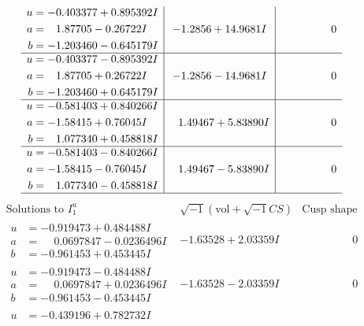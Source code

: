 \documentclass[1p]{elsarticle_modified}
\theoremstyle{definition}
\newcommand{\I}{\sqrt{-1}}
\begin{document}
$$\begin{array}{c|c|c}
\begin{aligned}
u &= -0.403377 + 0.895392 I \\
a &= \phantom{-}1.87705 - 0.26722 I \\
b &= -1.203460 - 0.645179 I\end{aligned}
 & -1.2856 + 14.9681 I & \phantom{-0.000000 } 0 \\ \hline\begin{aligned}
u &= -0.403377 - 0.895392 I \\
a &= \phantom{-}1.87705 + 0.26722 I \\
b &= -1.203460 + 0.645179 I\end{aligned}
 & -1.2856 - 14.9681 I & \phantom{-0.000000 } 0 \\ \hline\begin{aligned}
u &= -0.581403 + 0.840266 I \\
a &= -1.58415 + 0.76045 I \\
b &= \phantom{-}1.077340 + 0.458818 I\end{aligned}
 & \phantom{-}1.49467 + 5.83890 I & \phantom{-0.000000 } 0 \\ \hline\begin{aligned}
u &= -0.581403 - 0.840266 I \\
a &= -1.58415 - 0.76045 I \\
b &= \phantom{-}1.077340 - 0.458818 I\end{aligned}
 & \phantom{-}1.49467 - 5.83890 I & \phantom{-0.000000 } 0\\
 \hline 
 \end{array}$$\newpage$$\begin{array}{c|c|c}  
\text{Solutions to }I^u_{1}& \I (\text{vol} + \sqrt{-1}CS) & \text{Cusp shape}\\
 \hline 
\begin{aligned}
u &= -0.919473 + 0.484488 I \\
a &= \phantom{-}0.0697847 - 0.0236496 I \\
b &= -0.961453 + 0.453445 I\end{aligned}
 & -1.63528 + 2.03359 I & \phantom{-0.000000 } 0 \\ \hline\begin{aligned}
u &= -0.919473 - 0.484488 I \\
a &= \phantom{-}0.0697847 + 0.0236496 I \\
b &= -0.961453 - 0.453445 I\end{aligned}
 & -1.63528 - 2.03359 I & \phantom{-0.000000 } 0 \\ \hline\begin{aligned}
u &= -0.439196 + 0.782732 I \\

\end{aligned}
\end{array}$$
\end{document}
